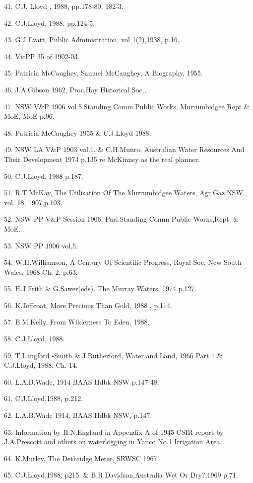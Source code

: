 41. C.J. Lloyd , 1988, pp.178-80, 182-3.

42. C.J.Lloyd, 1988,  pp.124-5.

43. G.J.Evatt, Public Administration, vol 1(2),1938, p.16.

44. VicPP 35 of 1902-03.

45. Patricia McCaughey,  Samuel McCaughey, A Biography, 1955.

46. J.A.Gibson 1962, Proc.Hay Historical Soc.,

47. NSW V\&P 1906 vol.5.Standing Comm.Public Works,  Murrumbidgee 
      Rept \& MoE, MoE p.96. 

48. Patricia McCaughey 1955 \& C.J.Lloyd 1988.

49. NSW LA V\&P 1903 vol.1, \&  C.H.Munro, Australian Water 
      Resources And Their Development 1974 p.135 re McKinney as the real 
      planner.

50. C.J.Lloyd, 1988 p.187.

51. R.T.McKay, The Utilisation Of The Murrumbidgee Waters, 
     Agr.Gaz.NSW., vol. 18, 1907,p.103.      

52. NSW PP V\&P Session 1906, Parl.Standing Comm Public Works,Rept. \&
      MoE. 

53. NSW PP 1906  vol.5. 

54. W.H.Williamson, A Century Of Scientific Progress, Royal Soc.
      New South Wales, 1968 Ch. 2, p.63.

55. H.J.Frith \& G.Sawer(eds), The Murray Waters, 1974 p.127.

56. K.Jeffcoat, More Precious Than Gold, 1988 , p.114.

57. B.M.Kelly, From Wilderness To Eden, 1988.

58. C.J.Lloyd, 1988.

59. T.Langford -Smith \& J.Rutherford, Water and Land, 1966 
      Part 1 \& C.J.Lloyd, 1988, Ch. 14.

60. L.A.B.Wade, 1914 BAAS Hdbk NSW p.147-48.

61. C.J.Lloyd,1988,  p.212.

62. L.A.B.Wade 1914, BAAS Hdbk NSW,  p.147.

63. Information by H.N.England in Appendix A of 1945 CSIR report by
      J.A.Prescott and others on waterlogging in Yanco No.1 Irrigation Area.

64. K.Murley, The Dethridge Meter, SRWSC 1967.

65. C.J.Lloyd,1988,  p215, \& B.R.Davidson,Australia Wet Or Dry?,1969 p.71.

